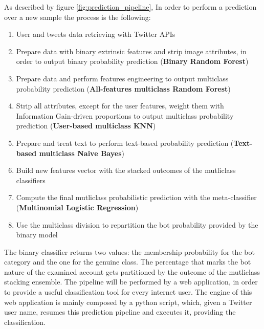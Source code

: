 As described by figure \ref{fig:prediction_pipeline}, In order to perform a prediction over a new sample the process is the following:
\begin{enumerate}
	\item User and tweets data retrieving with Twitter APIs
	\item Prepare data with binary extrinsic features and strip image attributes, in order to output binary probability prediction (\textbf{Binary Random Forest})
	\item Prepare data and perform features engineering to output multiclass probability prediction (\textbf{All-features multiclass Random Forest})
	\item Strip all attributes, except for the user features, weight them with Information Gain-driven proportions to output multiclass probability prediction (\textbf{User-based multiclass KNN})
	\item Prepare and treat text to perform text-based probability prediction (\textbf{Text-based multiclass Naive Bayes})
	\item Build new features vector with the stacked outcomes of the mutliclass classifiers
	\item Compute the final mutliclass probabilistic prediction with the meta-classifier (\textbf{Multinomial Logistic Regression})
	\item Use the multiclass division to repartition the bot probability provided by the binary model
\end{enumerate}
The binary classifier returns two values: the membership probability for the bot category and the one for the genuine class.
The percentage that marks the bot nature of the examined account gets partitioned by the outcome of the mutliclass stacking ensemble.
The pipeline will be performed by a web application, in order to provide a useful classification tool for every internet user.
The engine of this web application is mainly composed by a python script, which, given a Twitter user name, resumes this prediction pipeline and executes it, providing the classification.

